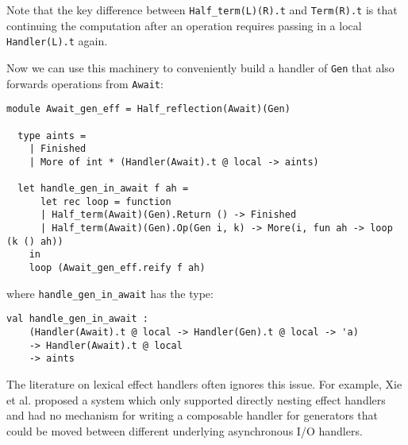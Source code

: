 \documentclass[acmsmall, screen, nonacm]{acmart}
\theoremstyle{definition}
\begin{document}
Note that the key difference between
\lstinline[style=oxcaml]{Half_term(L)(R).t} and
\lstinline[style=oxcaml]{Term(R).t} is that continuing the computation
after an operation requires passing in a local
\lstinline[style=oxcaml]{Handler(L).t} again.

%
%

Now we can use this machinery to conveniently build a handler of
\lstinline[style=oxcaml]{Gen} that also forwards operations from
\lstinline[style=oxcaml]{Await}:
\begin{lstlisting}[style=oxcaml]
  module Await_gen_eff = Half_reflection(Await)(Gen)

  type aints =
    | Finished
    | More of int * (Handler(Await).t @ local -> aints)

  let handle_gen_in_await f ah =
      let rec loop = function
      | Half_term(Await)(Gen).Return () -> Finished
      | Half_term(Await)(Gen).Op(Gen i, k) -> More(i, fun ah -> loop (k () ah))
    in
    loop (Await_gen_eff.reify f ah)
\end{lstlisting}
where \lstinline[style=oxcaml]{handle_gen_in_await} has the type:
\begin{lstlisting}[style=oxcaml]
  val handle_gen_in_await :
    (Handler(Await).t @ local -> Handler(Gen).t @ local -> 'a)
    -> Handler(Await).t @ local
    -> aints
\end{lstlisting}

The literature on lexical effect handlers often ignores this issue. For
example, Xie et al. \cite{xie2020effect} proposed a system which only
supported directly nesting effect handlers and had no mechanism for
writing a composable handler for generators that could be moved between
different underlying asynchronous I/O handlers.
\end{document}
